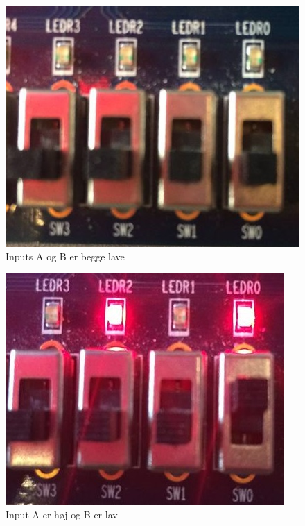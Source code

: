 \begin{enumerate}
	\begin{figure}[h]
		\centering
		\includegraphics[scale=0.6]{pictures/Oevelse8/opg1/Function0_0}
		\caption{Inputs A og B er begge lave}
		\label{fig:figur0_0}
	\end{figure}

	\begin{figure}[h]
		\centering
		\includegraphics[scale=0.7]{pictures/Oevelse8/opg1/Function0_1}
		\caption{Input A er høj og B er lav}
		\label{fig:figur0_1}
	\end{figure}


\end{enumerate}
